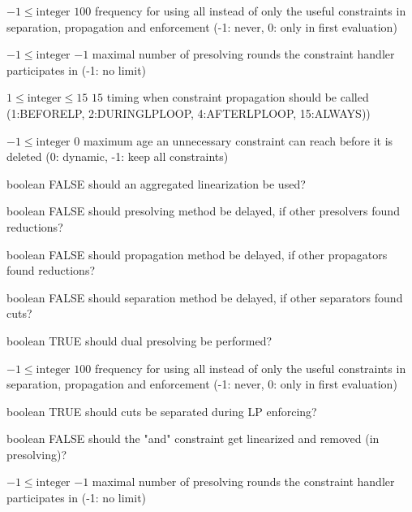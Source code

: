%
{$-1\leq\textrm{integer}$}%
{$100$}%
{frequency for using all instead of only the useful constraints in separation, propagation and enforcement (-1: never, 0: only in first evaluation)}%
{}

%
{$-1\leq\textrm{integer}$}%
{$-1$}%
{maximal number of presolving rounds the constraint handler participates in (-1: no limit)}%
{}

%
{$1\leq\textrm{integer}\leq15$}%
{$15$}%
{timing when constraint propagation should be called (1:BEFORELP, 2:DURINGLPLOOP, 4:AFTERLPLOOP, 15:ALWAYS))}%
{}

%
{$-1\leq\textrm{integer}$}%
{$0$}%
{maximum age an unnecessary constraint can reach before it is deleted (0: dynamic, -1: keep all constraints)}%
{}

%
{boolean}%
{FALSE}%
{should an aggregated linearization be used?}%
{}

%
{boolean}%
{FALSE}%
{should presolving method be delayed, if other presolvers found reductions?}%
{}

%
{boolean}%
{FALSE}%
{should propagation method be delayed, if other propagators found reductions?}%
{}

%
{boolean}%
{FALSE}%
{should separation method be delayed, if other separators found cuts?}%
{}

%
{boolean}%
{TRUE}%
{should dual presolving be performed?}%
{}

%
{$-1\leq\textrm{integer}$}%
{$100$}%
{frequency for using all instead of only the useful constraints in separation, propagation and enforcement (-1: never, 0: only in first evaluation)}%
{}

%
{boolean}%
{TRUE}%
{should cuts be separated during LP enforcing?}%
{}

%
{boolean}%
{FALSE}%
{should the "and" constraint get linearized and removed (in presolving)?}%
{}

%
{$-1\leq\textrm{integer}$}%
{$-1$}%
{maximal number of presolving rounds the constraint handler participates in (-1: no limit)}%
{}

